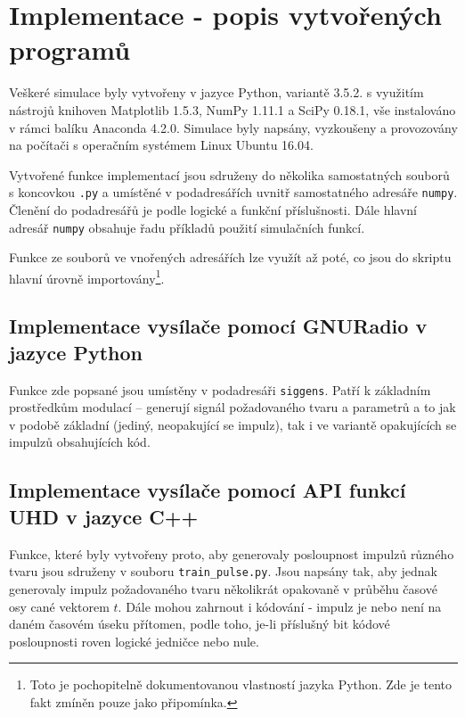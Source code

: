 \section{Implementace - popis vytvořených programů}

Veškeré simulace byly vytvořeny v jazyce Python, variantě 3.5.2. s využitím nástrojů knihoven Matplotlib 1.5.3, NumPy 1.11.1 a SciPy 0.18.1, vše instalováno v rámci balíku Anaconda 4.2.0. Simulace byly napsány, vyzkoušeny a provozovány na počítači s operačním systémem Linux Ubuntu 16.04.

Vytvořené funkce implementací jsou sdruženy do několika samostatných souborů s koncovkou \texttt{.py} a umístěné v podadresářích uvnitř samostatného adresáře \texttt{numpy}. Členění do podadresářů je podle logické a funkční příslušnosti. Dále hlavní adresář \texttt{numpy} obsahuje řadu příkladů použití simulačních funkcí.

Funkce ze souborů ve vnořených adresářích lze využít až poté, co jsou do skriptu hlavní úrovně importovány\footnote{Toto je pochopitelně dokumentovanou vlastností jazyka Python. Zde je tento fakt zmíněn pouze jako připomínka.}. 

\subsection{Implementace vysílače pomocí GNURadio v jazyce Python}

Funkce zde popsané jsou umístěny v podadresáři \texttt{siggens}. Patří k základním prostředkům modulací -- generují signál požadovaného tvaru a parametrů a to jak v podobě základní (jediný, neopakující se impulz), tak i ve variantě opakujících se impulzů obsahujících kód. 



\subsection{Implementace vysílače pomocí API funkcí UHD v jazyce C++}

Funkce, které byly vytvořeny proto, aby generovaly posloupnost impulzů různého tvaru jsou sdruženy v souboru \texttt{train\_pulse.py}. Jsou napsány tak, aby jednak generovaly impulz požadovaného tvaru několikrát opakovaně v průběhu časové osy cané vektorem $t$. Dále mohou zahrnout i kódování - impulz je nebo není na daném časovém úseku přítomen, podle toho, je-li příslušný bit kódové posloupnosti roven logické jedničce nebo nule. 


